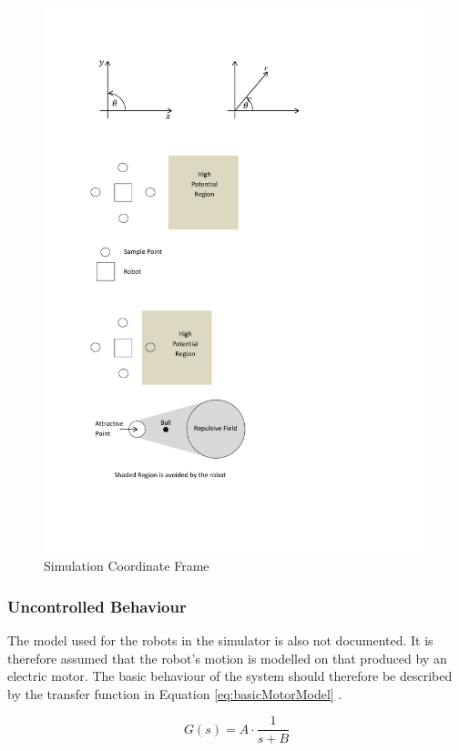 \documentclass[10pt]{article}
\begin{document}
\begin{figure}
 \centering
 \includegraphics[trim=2cm 23.5cm 13cm 2cm, clip=true]{Images/illustrations}
 \caption{Simulation Coordinate Frame}
 \label{fig:simCoordinateFrame}
\end{figure}

\subsubsection{Uncontrolled Behaviour}

The model used for the robots in the simulator is also not documented. It is
therefore assumed that the robot's motion is modelled on that produced by an
electric motor. The basic behaviour of the system should therefore be described
by the transfer function in Equation \ref{eq:basicMotorModel}
\cite{basicControlNotes}.

\begin{equation}
 \label{eq:basicMotorModel}
 G\left(s\right) = A \cdot \frac{1}{s+B}
\end{equation}
\end{document}
